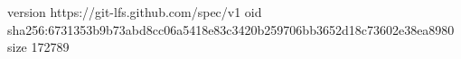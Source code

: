 version https://git-lfs.github.com/spec/v1
oid sha256:6731353b9b73abd8cc06a5418e83c3420b259706bb3652d18c73602e38ea8980
size 172789
